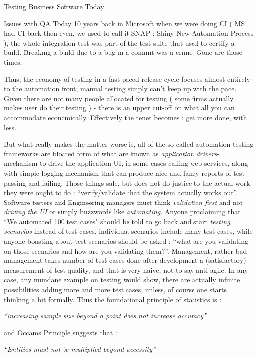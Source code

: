 \begin{section}{Testing Business Software Today}
\begin{subsection}{Issues with QA Today}
10 years back in Microsoft when we were doing CI ( MS had CI back then even, we used to call it SNAP : Shiny New Automation Process ), the whole integration test was part of the test suite that used to certify a build. Breaking a build due to a bug  in a commit was a crime. Gone are those times.

Thus, the economy of testing in a fast paced release cycle focuses almost entirely to the automation front, manual testing simply can't keep up with the pace.  Given there are not  many people allocated for testing ( some firms actually makes user do their testing ) - there is an upper cut-off on what all you can accommodate economically. Effectively the tenet becomes :  get more done, with less. 

But what really makes the matter worse is, all of the so called automation testing frameworks are bloated form of  what are known as \emph{application drivers}- mechanism to drive the application UI, in some cases calling web services,  along with simple logging mechanism that can produce nice and fancy reports of test passing and failing. Those things  sale, but does not do justice to the actual work they were ought to do : ``verify/validate that the system actually works out''. Software testers and Engineering managers must think \emph{validation first} and not \emph{driving the UI} or simply buzzwords like \emph{automating}.  Anyone proclaiming that ``We automated 100 test cases" should be told to go back and start \emph{testing scenarios} instead of test cases, individual scenarios include many test cases, while anyone  boasting about test scenarios should be asked : ``what are you validating on those scenarios and how are you validating them?''. Management, rather bad management takes number of test cases done after development a (satisfactory) measurement of test quality, and that is very naive, not to say anti-agile. In any case, any mundane example on testing would show, there are actually infinite possibilities adding more and more test cases, unless, of course one starts thinking a bit formally. Thus the foundational principle of statistics is :

\begin{center}
\emph{ ``increasing sample size beyond a point does not increase accuracy'' }
\end{center}

and \href{https://en.wikipedia.org/wiki/Occam\%27s\_razor}{Occams Principle} suggests that : 

\begin{center}
\emph{ ``Entities must not be multiplied beyond necessity'' }
\end{center}


\end{subsection}
\end{section}

